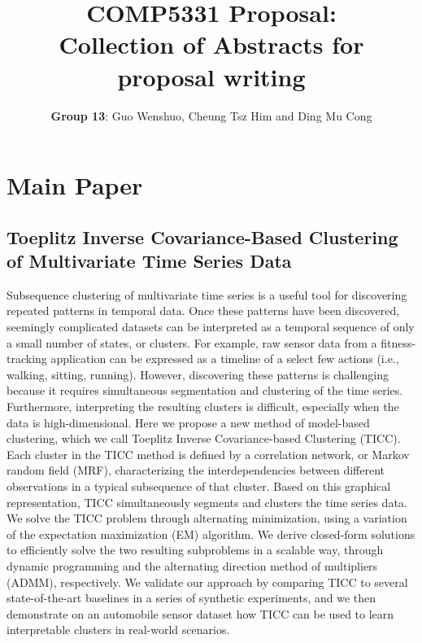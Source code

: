 \documentclass{llncs}
\begin{document}
%
\frontmatter          %
%
\pagestyle{headings}  %

\title{COMP5331 Proposal: \\ Collection of Abstracts for proposal writing}
\author{{\bf Group 13}: Guo Wenshuo, Cheung Tsz Him and Ding Mu Cong}


\maketitle %

\section{Main Paper}
\subsection{Toeplitz Inverse Covariance-Based Clustering of Multivariate Time Series Data\cite{tiic}}
Subsequence clustering of multivariate time series is a useful tool for discovering repeated patterns in temporal data. Once these patterns have been discovered, seemingly complicated datasets can be interpreted as a temporal sequence of only a small number of states, or clusters. For example, raw sensor data from a fitness-tracking application can be expressed as a timeline of a select few actions (i.e., walking, sitting, running). However, discovering these patterns is challenging because it requires simultaneous segmentation and clustering of the time series. Furthermore, interpreting the resulting clusters is difficult, especially when the data is high-dimensional. Here we propose a new method of model-based clustering, which we call Toeplitz Inverse Covariance-based Clustering (TICC). Each cluster in the TICC method is defined by a correlation network, or Markov random field (MRF), characterizing the interdependencies between different observations in a typical subsequence of that cluster. Based on this graphical representation, TICC simultaneously segments and clusters the time series data. We solve the TICC problem through alternating minimization, using a variation of the expectation maximization (EM) algorithm. We derive closed-form solutions to efficiently solve the two resulting subproblems in a scalable way, through dynamic programming and the alternating direction method of multipliers (ADMM), respectively. We validate our approach by comparing TICC to several state-of-the-art baselines in a series of synthetic experiments, and we then demonstrate on an automobile sensor dataset how TICC can be used to learn interpretable clusters in real-world scenarios.
\end{document}
